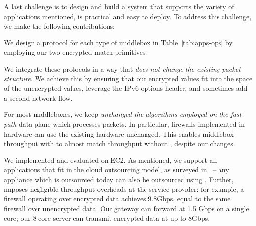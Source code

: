 A last challenge is to design and build a system that supports the variety of applications mentioned, is practical and easy to deploy. 
To address this challenge, we make the following contributions:
\begin{CompactItemize}
\item We design a  protocol for each type of middlebox in Table~\ref{tab:apps-ops} by employing our two encrypted match  primitives.
\item  We integrate these protocols in a way that {\em does not change the existing packet structure}. We achieve this by ensuring that our encrypted values fit into the space of the unencrypted values, leverage the IPv6 options header, and sometimes add a second network flow.
\item  For most middleboxes, we keep {\em unchanged  the algorithms employed on the fast path} data plane which processes packets. In particular, firewalls implemented in hardware can use the existing hardware unchanged.  This enables middlebox throughput with \sys to almost match throughput without \sys, despite our changes.
\end{CompactItemize}




We implemented and evaluated \sys on EC2. As mentioned, we support all applications that fit in the cloud outsourcing model, as surveyed in~\cite{aplomb} -- any appliance which is outsourced today can also be outsourced using \sys.
Further, \sys imposes negligible throughput overheads at the service provider: for example, a firewall operating over encrypted data achieves 9.8Gbps, equal to the same firewall over unencrypted data.
Our gateway can forward at 1.5 Gbps on a single core; our 8 core server can transmit \sys encrypted data at up to 8Gbps.%
